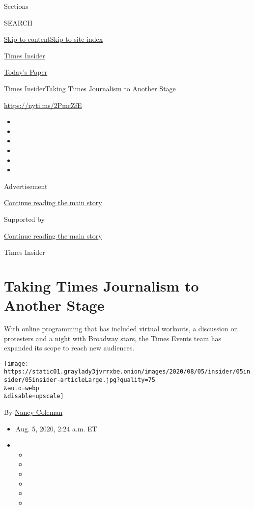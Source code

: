 Sections

SEARCH

\protect\hyperlink{site-content}{Skip to
content}\protect\hyperlink{site-index}{Skip to site index}

\href{https://www.nytimes3xbfgragh.onion/section/reader-center}{Times
Insider}

\href{https://myaccount.nytimes3xbfgragh.onion/auth/login?response_type=cookie\&client_id=vi}{}

\href{https://www.nytimes3xbfgragh.onion/section/todayspaper}{Today's
Paper}

\href{/section/reader-center}{Times Insider}\textbar{}Taking Times
Journalism to Another Stage

\url{https://nyti.ms/2PmcZfE}

\begin{itemize}
\item
\item
\item
\item
\item
\item
\end{itemize}

Advertisement

\protect\hyperlink{after-top}{Continue reading the main story}

Supported by

\protect\hyperlink{after-sponsor}{Continue reading the main story}

Times Insider

\hypertarget{taking-times-journalism-to-another-stage}{%
\section{Taking Times Journalism to Another
Stage}\label{taking-times-journalism-to-another-stage}}

With online programming that has included virtual workouts, a discussion
on protesters and a night with Broadway stars, the Times Events team has
expanded its scope to reach new audiences.

\texttt{[image: https://static01.graylady3jvrrxbe.onion/images/2020/08/05/insider/05insider/05insider-articleLarge.jpg?quality=75\\\&auto=webp\\\&disable=upscale]}

By \href{https://www.nytimes3xbfgragh.onion/by/nancy-coleman}{Nancy
Coleman}

\begin{itemize}
\item
  Aug. 5, 2020, 2:24 a.m. ET
\item
  \begin{itemize}
  \item
  \item
  \item
  \item
  \item
  \item
  \end{itemize}
\end{itemize}

